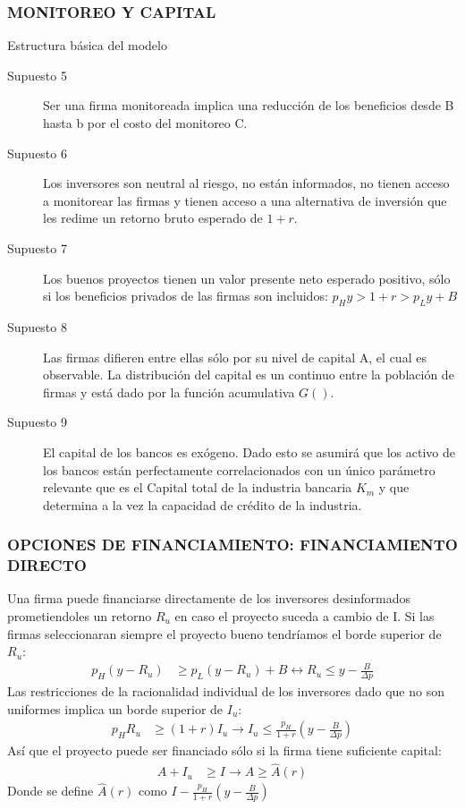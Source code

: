 \documentclass[10pt, xcolor=table, x11names]{beamer}
\begin{document}
\begin{frame}
    \frametitle{{\normalsize MONITOREO Y CAPITAL} {}}
    
    \begin{block} {Estructura básica del modelo}
        \begin{description}
             \item[Supuesto 5] Ser una firma monitoreada implica una reducción de los beneficios desde B hasta b por el costo del monitoreo C.
            \item[Supuesto 6] Los inversores son neutral al riesgo, no están informados, no tienen acceso a monitorear las firmas y tienen acceso a una alternativa de inversión que les redime un retorno bruto esperado de $1+r$.
           \item[Supuesto 7] Los buenos proyectos tienen un valor presente neto esperado positivo, sólo si los beneficios privados de las firmas son incluidos: $p_{H}y>1+r>p_{L}y+B $
           \item[Supuesto 8] Las firmas difieren entre ellas sólo por su nivel de capital A, el cual es observable. La distribución del capital es un continuo entre la población de firmas y está dado por la función acumulativa $G()$.
            \item[Supuesto 9] El capital de los bancos es exógeno. Dado esto se asumirá que los activo de los bancos están perfectamente correlacionados con un único parámetro relevante que es el Capital total de la industria bancaria $K_{m}$ y que determina a la vez la capacidad de crédito de la industria.  
        \end{description}
          
    \end{block}	

   \end{frame}

\begin{frame}
    \frametitle{{\normalsize OPCIONES DE FINANCIAMIENTO: FINANCIAMIENTO DIRECTO} {}}

 Una firma puede financiarse directamente de los inversores desinformados prometiendoles un retorno $R_{u}$ en caso el proyecto suceda  a cambio de I. Si las firmas seleccionaran siempre el proyecto bueno tendríamos el borde superior de $R_{u}$:
 \begin{align}
 p_{H}(y-R_{u})&\geq p_{L}(y-R_{u})+B\leftrightarrow R_{u}\leq y-\frac{B}{\Delta p}
 \end{align}
 Las restricciones de la racionalidad individual de los inversores dado que no son uniformes implica un borde superior de $I_{u}$:
 \begin{align}
 p_{H}R_{u}&\geq (1+r)I_{u}\rightarrow I_{u}\leq \frac{p_{H}}{1+r}(y-\frac{B}{\Delta p})
 \end{align}
 Así que el proyecto puede ser financiado sólo si la firma tiene suficiente capital:
 \begin{align}
 A+I_{u}&\geq I \rightarrow A \geq \hat{A}(r) 
 \end{align}
 Donde se define $\hat{A}(r)$ como $I-\frac{p_{H}}{1+r}(y-\frac{B}{\Delta p})$
 
 \end{frame}
\end{document}
